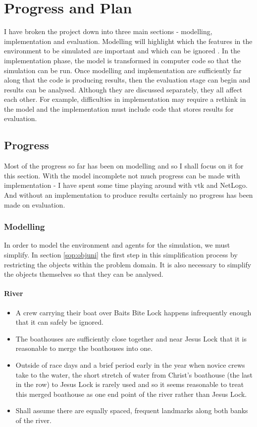 \chapter{Progress and Plan}

I have broken
the project down into three main sections - modelling,
implementation and evaluation. Modelling will highlight which the features in the
environment to be simulated are important and which can be ignored
\cite{Sterling2009}. In the implementation phase, the model is transformed in
computer code so that the simulation can be run. Once modelling and
implementation are sufficiently far along that the code is producing
results, then the evaluation stage can begin and results can be
analysed. Although they are discussed separately, they all affect each
other. For example, difficulties in implementation may require a rethink in the
model and the implementation must include code that stores results for
evaluation.

\section{Progress}
Most of the progress so far has been on modelling and so I shall focus
on it for this section. With the model incomplete not much progress
can be made with implementation - I have spent some time playing
around with vtk and NetLogo. And without an implementation to produce
results certainly no progress has been made on evaluation.

\subsection{Modelling} \label{prog:model}
In order to model the environment and agents for the simulation, we
must simplify. In section \ref{sop:objuni} the first step in this
simplification process by restricting the
objects within the problem domain. It is also necessary to
simplify the objects themselves so that they can be analysed.

\subsubsection{River}
\begin{itemize}
  \item A crew carrying their boat over Baits Bite Lock happens infrequently enough that it can safely be ignored.
  \item The boathouses are sufficiently close together and near Jesus Lock that it is reasonable to merge the boathouses into one. 
  \item Outside of race days and a brief period early in the year when
    novice crews take to the water, the short stretch of water from
    Christ's boathouse (the last in the row) to Jesus Lock is rarely
    used and so it seems reasonable to treat this merged boathouse as
    one end point of the river rather than Jesus Lock.
  \item Shall assume there are equally spaced, frequent landmarks
    along both banks of the river.
\end{itemize}

